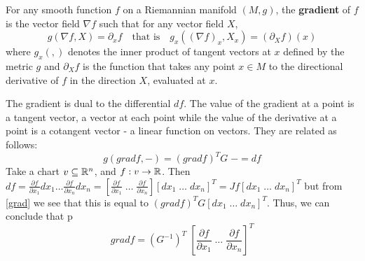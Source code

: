 \documentclass[11pt,a4paper]{report}
\begin{document}
\begin{defn}
  For any smooth function $f$ on a Riemannian manifold $(M,g)$, the \textbf{gradient} of $f$ is the vector field
  $\nabla f$ such that for any vector field $X$,
  $$ g(\nabla f, X ) = \partial_x f \quad \text{that is} \quad g_x((\nabla f)_x, X_x) = (\partial_X f)(x)$$
  where $g_x(,)$ denotes the inner product of tangent vectors at $x$ defined by the metric
  $g$ and $\partial_X f$ is the function that takes any point $x \in M$ to the directional derivative of $f$ in the direction $X$, evaluated at $x$.
\end{defn}
The gradient is dual to the differential $df$. The value of the gradient at a point is a tangent vector, a vector at each point
while the value of the derivative at a point is a cotangent vector - a linear function on vectors. They are related as follows:
\begin{equation} \label{grad}
 g(grad f, -) = (grad f)^T G \; - =  df 
\end{equation}
Take a chart $v \subseteq \mathbb{R}^n$, and $f: v \to \mathbb{R}$. Then $df = \frac{\partial f}{\partial x_1} dx_1 \dots \frac{\partial f}{\partial x_n} dx_n
= [ \frac{\partial f}{\partial x_1} \; \dots \; \frac{\partial f}{\partial x_n}] [dx_1 \; \dots \; dx_n]^T =
Jf [dx_1 \; \dots \; dx_n]^T$ but from \ref{grad} we see that this is equal to $ (grad f)^T G [dx_1 \; \dots \; dx_n]^T $.
Thus, we can conclude that p
$$ grad f = (G^{-1})^T \; [ \frac{\partial f}{\partial x_1} \; \dots \; \frac{\partial f}{\partial x_n}]^T $$
\end{document}
